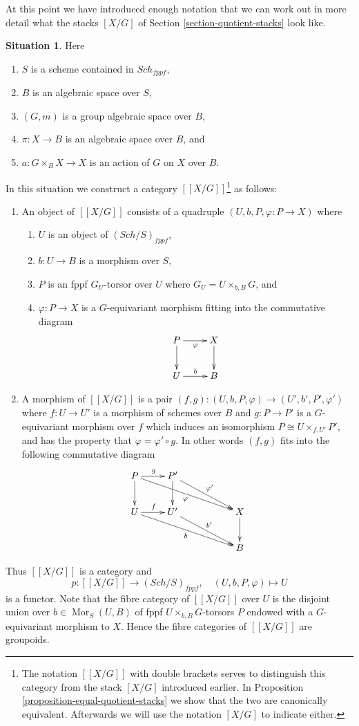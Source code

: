 \documentclass{stacks-project}
\theoremstyle{plain}
\theoremstyle{definition}
\newtheorem{situation}[subsection]{Situation}
\theoremstyle{remark}
\numberwithin{equation}{subsection}
\def\Sch{\mathit{Sch}}
\def\Mor{\mathop{\mathrm{Mor}}\nolimits}
\begin{document}
\noindent
At this point we have introduced enough notation that we can work out
in more detail what the stacks $[X/G]$ of
Section \ref{section-quotient-stacks}
look like.

\begin{situation}
\label{situation-quotient-stack}
Here
\begin{enumerate}
\item $S$ is a scheme contained in $\Sch_{fppf}$,
\item $B$ is an algebraic space over $S$,
\item $(G, m)$ is a group algebraic space over $B$,
\item $\pi : X \to B$ is an algebraic space over $B$, and
\item $a : G \times_B X \to X$ is an action of $G$ on $X$ over $B$.
\end{enumerate}
\end{situation}

\noindent
In this situation we construct a category $[[X/G]]$\footnote{The notation
$[[X/G]]$ with double brackets serves to distinguish this category from
the stack $[X/G]$ introduced earlier. In
Proposition \ref{proposition-equal-quotient-stacks}
we show that the two are canonically equivalent.
Afterwards we will use the notation $[X/G]$ to indicate either.} as follows:
\begin{enumerate}
\item An object of $[[X/G]]$ consists of a quadruple
$(U, b, P, \varphi : P \to X)$ where
\begin{enumerate}
\item $U$ is an object of $(\Sch/S)_{fppf}$,
\item $b : U \to B$ is a morphism over $S$,
\item $P$ is an fppf $G_U$-torsor over $U$ where $G_U = U \times_{b, B} G$, and
\item $\varphi : P \to X$ is a $G$-equivariant morphism fitting
into the commutative diagram
$$
\xymatrix{
P \ar[d] \ar[r]_{\varphi} & X \ar[d] \\
U \ar[r]^b & B
}
$$
\end{enumerate}
\item A morphism of $[[X/G]]$ is a pair
$(f, g) : (U, b, P, \varphi) \to (U', b', P', \varphi')$
where $f : U \to U'$ is a morphism of schemes over $B$
and $g : P \to P'$ is a $G$-equivariant morphism over $f$
which induces an isomorphism $P \cong U \times_{f, U'} P'$, and has
the property that $\varphi = \varphi' \circ g$.
In other words $(f, g)$ fits into the following commutative
diagram
$$
\xymatrix{
P \ar[d] \ar[rrrd]_\varphi \ar[r]^g & P' \ar[d] \ar[rrd]^{\varphi'} \\
U \ar[rrrd]_b \ar[r]^f & U' \ar[rrd]^{b'} & & X \ar[d] \\
& & & B
}
$$
\end{enumerate}
Thus $[[X/G]]$ is a category and
$$
p : [[X/G]] \longrightarrow (\Sch/S)_{fppf},
\quad
(U, b, P, \varphi) \longmapsto U
$$
is a functor. Note that the fibre category of $[[X/G]]$
over $U$ is the disjoint union over $b \in \Mor_S(U, B)$
of fppf $U \times_{b, B} G$-torsors $P$ endowed with a $G$-equivariant
morphism to $X$. Hence the fibre categories of $[[X/G]]$ are groupoids.
\end{document}
